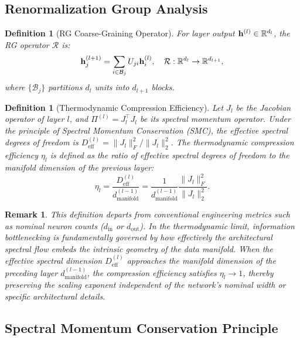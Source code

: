 \documentclass[11pt, a4paper]{article}
\newtheorem{dfn}[theo]{Definition}
\theoremstyle{plain}
\newtheorem*{remark}{Remark}
\def\R{{\mathbb R}}
\def\bfh{{\bf h}}
\def\sR{{\mathcal R}}
\begin{document}
\subsection{Renormalization Group Analysis}

\begin{dfn}[RG Coarse-Graining Operator]\label{dfn:rg_operator}
For layer output $\bfh^{(l)} \in \R^{d_l}$, the RG operator $\sR$ is:
\begin{equation}
\bfh^{(l+1)}_j = \sum_{i \in \mathcal{B}_j} U_{ji} \bfh^{(l)}_i, \quad \sR: \R^{d_l} \to \R^{d_{l+1}},
\label{eq:rg_operator}
\end{equation}
where $\{\mathcal{B}_j\}$ partitions $d_l$ units into $d_{l+1}$ blocks.
\end{dfn}

\begin{dfn}[Thermodynamic Compression Efficiency]\label{dfn:compression_efficiency}
Let $J_l$ be the Jacobian operator of layer $l$, and $\Pi^{(l)} = J_l^\top J_l$ be its spectral momentum operator. Under the principle of Spectral Momentum Conservation (SMC), the effective spectral degrees of freedom is $D_{\text{eff}}^{(l)} = \|J_l\|_F^2 / \|J_l\|_2^2$. The thermodynamic compression efficiency $\eta_l$ is defined as the ratio of effective spectral degrees of freedom to the manifold dimension of the previous layer:
\begin{equation}
\eta_l = \frac{D_{\text{eff}}^{(l)}}{d_{\text{manifold}}^{(l-1)}} = \frac{1}{d_{\text{manifold}}^{(l-1)}} \frac{\|J_l\|_F^2}{\|J_l\|_2^2}.
\label{eq:eta_def}
\end{equation}
\end{dfn}

\begin{remark}
This definition departs from conventional engineering metrics such as nominal neuron counts ($d_{\text{in}}$ or $d_{\text{out}}$). In the thermodynamic limit, information bottlenecking is fundamentally governed by how effectively the architectural spectral flow embeds the intrinsic geometry of the data manifold. When the effective spectral dimension $D_{\text{eff}}^{(l)}$ approaches the manifold dimension of the preceding layer $d_{\text{manifold}}^{(l-1)}$, the compression efficiency satisfies $\eta_l \to 1$, thereby preserving the scaling exponent independent of the network's nominal width or specific architectural details.
\end{remark}

\subsection{Spectral Momentum Conservation Principle}
\end{document}
